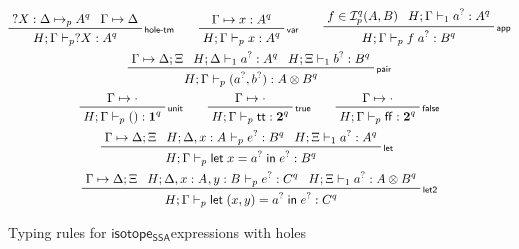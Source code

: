 \documentclass[acmsmall,screen,review]{acmart}
\newcommand{\mc}[1]{\ensuremath{\mathcal{#1}}}
\newcommand{\mb}[1]{\ensuremath{\mathbf{#1}}}
\newcommand{\ms}[1]{\ensuremath{\mathsf{#1}}}
\newcommand{\lbl}[1]{{`#1}}
\newcommand{\ctt}{\ms{tt}}
\newcommand{\cff}{\ms{ff}}
\newcommand{\letexpr}[3]{\ensuremath{\ms{let}\;#1 = #2\;\ms{in}\;#3}}
\newcommand{\csplits}[3]{#1 \mapsto #2;#3}
\newcommand{\cwk}[2]{#1 \mapsto #2}
\newcommand{\thyp}[3]{#1: {#2}^{#3}}
\newcommand{\lhyp}[3]{#1[#2](#3)}
\newcommand{\llhyp}[3]{\lhyp{\lbl{#1}}{#2}{#3}}
\newcommand{\rle}[1]{{\scriptsize\textsf{#1}}}
\newcommand{\mhole}[1]{{#1}^?}
\newcommand{\lhole}[1]{?#1}
\newcommand{\mhasty}[6]{#1;#2 \vdash_{#3} #4: {#5}^{#6}}
\newcommand{\mhaslb}[4]{#1;#2 \vdash #3 \rhd #4}
\newcommand{\tyhole}[5]{#1: #2 \mapsto_{#3} {#4}^{#5}}
\newcommand{\isotopessa}{\ms{isotope_{SSA}}}
\begin{document}
\begin{figure}
  \begin{gather*}    
    \prftree[r]{\rle{hole-tm}}
      {\tyhole{\lhole{X}}{\Delta}{p}{A}{q}}
      {\cwk{\Gamma}{\Delta}}
      {\mhasty{H}{\Gamma}{p}{\lhole{X}}{A}{q}} \qquad
    \prftree[r]{\rle{var}}
      {\cwk{\Gamma}{\thyp{x}{A}{q}}}
      {\mhasty{H}{\Gamma}{p}{x}{A}{q}} \qquad
    \prftree[r]{\rle{app}}
      {f \in \mc{I}_p^q(A, B)}
      {\mhasty{H}{\Gamma}{1}{\mhole{a}}{A}{q}}
      {\mhasty{H}{\Gamma}{p}{f\;\mhole{a}}{B}{q}} \\
    \prftree[r]{\rle{pair}}
      {\csplits{\Gamma}{\Delta}{\Xi}}
      {\mhasty{H}{\Delta}{1}{\mhole{a}}{A}{q}}
      {\mhasty{H}{\Xi}{1}{\mhole{b}}{B}{q}}
      {\mhasty{H}{\Gamma}{p}{(\mhole{a}, \mhole{b})}{A \otimes B}{q}} \\
    \prftree[r]{\rle{unit}}
      {\cwk{\Gamma}{\cdot}}
      {\mhasty{H}{\Gamma}{p}{()}{\mb{1}}{q}} \qquad
    \prftree[r]{\rle{true}}
      {\cwk{\Gamma}{\cdot}}
      {\mhasty{H}{\Gamma}{p}{\ctt}{\mb{2}}{q}} \qquad
    \prftree[r]{\rle{false}}
      {\cwk{\Gamma}{\cdot}}
      {\mhasty{H}{\Gamma}{p}{\cff}{\mb{2}}{q}} \\
    \prftree[r]{\rle{let}}
      {\csplits{\Gamma}{\Delta}{\Xi}}
      {\mhasty{H}{\Delta, \thyp{x}{A}{}}{p}{\mhole{e}}{B}{q}}
      {\mhasty{H}{\Xi}{1}{\mhole{a}}{A}{q}}
      {\mhasty{H}{\Gamma}{p}{\letexpr{x}{\mhole{a}}{\mhole{e}}}{B}{q}} \qquad
      \\
    \prftree[r]{\rle{let2}}
      {\csplits{\Gamma}{\Delta}{\Xi}}
      {\mhasty{H}{\Delta, \thyp{x}{A}{}, \thyp{y}{B}{}}{p}{\mhole{e}}{C}{q}}
      {\mhasty{H}{\Xi}{1}{\mhole{a}}{A \otimes B}{q}}
      {\mhasty{H}{\Gamma}{p}{\letexpr{(x, y)}{\mhole{a}}{\mhole{e}}}{C}{q}}
  \end{gather*}
  \caption{Typing rules for \isotopessa expressions with holes}
  \label{fig:terms-with-holes-typing}
\end{figure}
\end{document}
